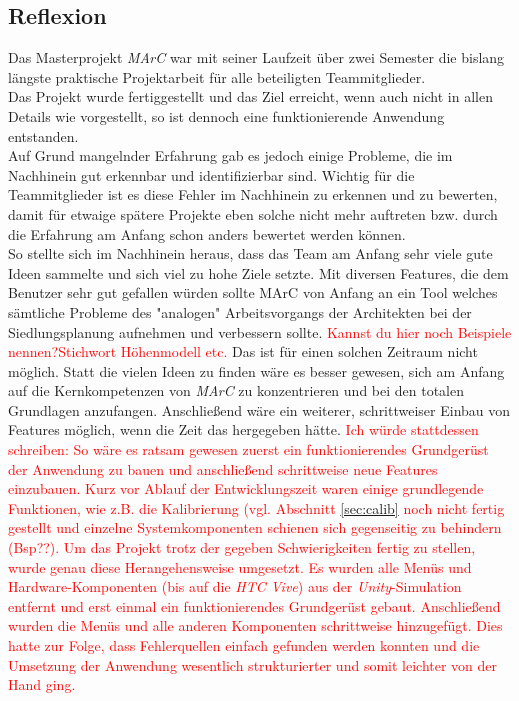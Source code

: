 \subsection{Reflexion}\label{sec:reflexion}
Das Masterprojekt \textit{MArC} war mit seiner Laufzeit über zwei Semester die bislang längste praktische Projektarbeit für alle beteiligten Teammitglieder. \\
Das Projekt wurde fertiggestellt und das Ziel erreicht, wenn auch nicht in allen Details wie vorgestellt, so ist dennoch eine funktionierende Anwendung entstanden.\\
Auf Grund mangelnder Erfahrung gab es jedoch einige Probleme, die im Nachhinein gut erkennbar und identifizierbar sind. Wichtig für die Teammitglieder ist es diese Fehler  im Nachhinein zu erkennen und zu bewerten, damit für etwaige spätere Projekte eben solche nicht mehr auftreten bzw. durch die Erfahrung am Anfang schon anders bewertet werden können.\\
So stellte sich im Nachhinein heraus, dass das Team am Anfang sehr viele gute Ideen sammelte und sich viel zu hohe Ziele setzte. Mit diversen Features, die dem Benutzer sehr gut gefallen würden sollte MArC von Anfang an ein Tool welches sämtliche Probleme des "analogen" Arbeitsvorgangs der Architekten bei der Siedlungsplanung aufnehmen und verbessern sollte. \textcolor{red}{Kannst du hier noch Beispiele nennen?Stichwort Höhenmodell etc.} Das ist für einen solchen Zeitraum nicht möglich. Statt die vielen Ideen zu finden wäre es besser gewesen, sich am Anfang auf die Kernkompetenzen von \textit{MArC} zu konzentrieren und bei den totalen Grundlagen anzufangen.   Anschließend wäre ein weiterer, schrittweiser Einbau von Features möglich, wenn die Zeit das hergegeben hätte. \textcolor{red}{Ich würde stattdessen schreiben: So wäre es ratsam gewesen zuerst ein funktionierendes Grundgerüst der Anwendung zu bauen und anschließend schrittweise neue Features einzubauen. Kurz vor Ablauf der Entwicklungszeit waren einige grundlegende Funktionen, wie z.B. die Kalibrierung (vgl. Abschnitt \ref{sec:calib} noch nicht fertig gestellt und einzelne Systemkomponenten schienen sich gegenseitig zu behindern (Bsp??). Um das Projekt trotz der gegeben Schwierigkeiten fertig zu stellen, wurde genau diese Herangehensweise umgesetzt. Es wurden alle Menüs und Hardware-Komponenten (bis auf die \textit{HTC Vive}) aus der \textit{Unity}-Simulation entfernt und erst einmal ein funktionierendes Grundgerüst gebaut. Anschließend wurden die Menüs und alle anderen Komponenten schrittweise hinzugefügt. Dies hatte zur Folge, dass Fehlerquellen einfach gefunden werden konnten und die Umsetzung der Anwendung wesentlich strukturierter und somit leichter von der Hand ging.}\\
